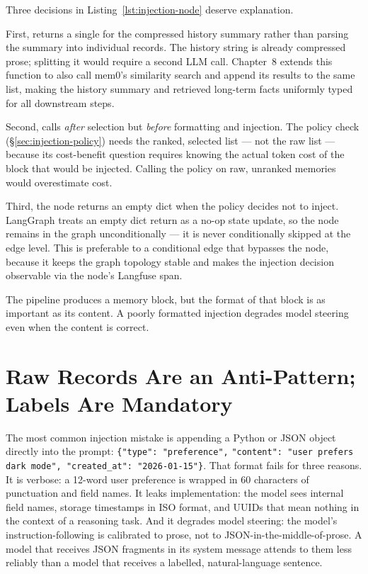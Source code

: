 Three decisions in Listing~\ref{lst:injection-node} deserve explanation.

First,  returns a single
 for the compressed history summary rather than
parsing the summary into individual records. The history string is
already compressed prose; splitting it would require a second LLM call.
Chapter~8 extends this function to also call mem0's similarity search
and append its results to the same list, making the history summary and
retrieved long-term facts uniformly typed for all downstream steps.

Second,  calls
 \emph{after} selection but \emph{before}
formatting and injection. The policy check (\S\ref{sec:injection-policy})
needs the ranked, selected list --- not the raw list --- because its
cost-benefit question requires knowing the actual token cost of the
block that would be injected. Calling the policy on raw, unranked
memories would overestimate cost.

Third, the node returns an empty dict \code{\{\}} when the policy
decides not to inject. LangGraph treats an empty dict return as a no-op
state update, so the node remains in the graph unconditionally --- it
is never conditionally skipped at the edge level. This is preferable to
a conditional edge that bypasses the node, because it keeps the graph
topology stable and makes the injection decision observable via the
node's Langfuse span.

The pipeline produces a memory block, but the format of that block is
as important as its content. A poorly formatted injection degrades model
steering even when the content is correct.

\section{Raw Records Are an Anti-Pattern; Labels Are Mandatory}
\label{sec:compact-format}

The most common injection mistake is appending a Python  or
JSON object directly into the prompt: \verb|{"type": "preference",|
\verb|"content": "user prefers dark mode", "created_at": "2026-01-15"}|.
That format fails for three reasons. It is verbose: a 12-word user
preference is wrapped in 60 characters of punctuation and field names.
It leaks implementation: the model sees internal field names, storage
timestamps in ISO format, and UUIDs that mean nothing in the context of
a reasoning task. And it degrades model steering: the model's
instruction-following is calibrated to prose, not to JSON-in-the-middle-of-prose.
A model that receives JSON fragments in its system message attends to them
less reliably than a model that receives a labelled, natural-language
sentence.

